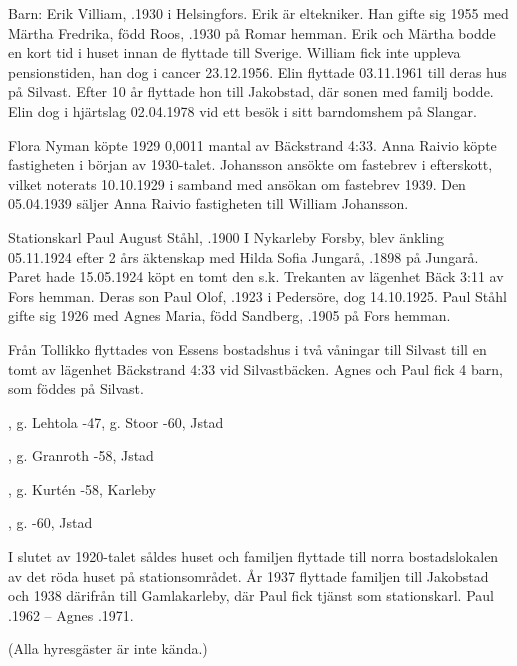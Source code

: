 Barn: Erik Villiam, .1930 i Helsingfors. Erik är eltekniker. Han gifte sig 1955 med 	Märtha Fredrika, född Roos, .1930 på Romar hemman. Erik och Märtha bodde en kort tid i huset innan de flyttade till Sverige. William fick inte uppleva pensionstiden, han dog i cancer 23.12.1956. Elin flyttade 03.11.1961 till deras hus på Silvast. Efter 10 år flyttade hon till Jakobstad, där sonen med familj bodde. Elin dog i hjärtslag 02.04.1978 vid ett besök i sitt barndomshem på Slangar.


Flora Nyman köpte 1929 0,0011 mantal av Bäckstrand 4:33. Anna Raivio  köpte fastigheten i början av 1930-talet. Johansson ansökte om fastebrev i efterskott, vilket noterats 10.10.1929 i samband med ansökan	om fastebrev 1939. Den 05.04.1939 säljer Anna Raivio fastigheten till William Johansson.


Stationskarl Paul August Ståhl, .1900 I Nykarleby Forsby, blev änkling 05.11.1924 efter 2 års äktenskap med Hilda Sofia Jungarå, .1898 på Jungarå. Paret hade 15.05.1924	köpt en tomt den s.k. Trekanten av lägenhet Bäck 3:11 av Fors hemman. Deras son Paul Olof, .1923 i Pedersöre, dog 14.10.1925.	Paul Ståhl gifte sig 1926 med Agnes Maria, född Sandberg, .1905 på Fors hemman.

Från Tollikko flyttades von Essens bostadshus i två våningar till	Silvast till en tomt av lägenhet Bäckstrand 4:33 vid Silvastbäcken. Agnes och Paul fick 4 barn, som föddes på Silvast.
\begin{jhchildren}
  \item {}, g. Lehtola -47, g. Stoor -60, Jstad
  \item {}, g. Granroth -58, Jstad
  \item {}, g. Kurtén -58, Karleby
  \item {}, g. -60, Jstad
\end{jhchildren}
I slutet av 1920-talet såldes huset och familjen flyttade till norra bostadslokalen av det röda huset på stationsområdet. År 1937 flyttade 	familjen till Jakobstad och 1938 därifrån till Gamlakarleby, där Paul fick tjänst som stationskarl.  Paul .1962  --  Agnes .1971.


  (Alla hyresgäster är inte kända.)

